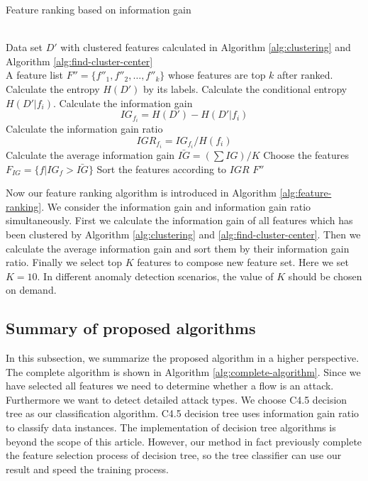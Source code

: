 \documentclass{ieeeaccess}
\theoremstyle{definition}
\begin{document}
\begin{algorithm}
    \caption{Feature ranking based on information gain}
    \label{alg:feature-ranking}
    \begin{algorithmic}[1]
        \REQUIRE ~~\\
            Data set $D'$ with clustered features calculated in Algorithm \ref{alg:clustering} and Algorithm \ref{alg:find-cluster-center}
        \ENSURE ~~\\
            A feature list $F''=\{f''_1, f''_2, \ldots, f''_k\}$ whose  features are top $k$ after ranked.
        \STATE Calculate the entropy $H(D')$ by its labels.
            \STATE Calculate the conditional entropy $H(D'|f_i)$.
            \STATE Calculate the information gain $$IG_{f_i} = H(D') - H(D'|f_i)$$
            \STATE Calculate the information gain ratio
            $$IGR_{f_i} = IG_{f_i}/H(f_i)$$
        \ENDFOR
        \STATE Calculate the average information gain $\bar{IG}=(\sum IG)/K$
        \STATE Choose the features $F_{IG}=\{f|IG_{f} > \bar{IG}\}$
        \STATE Sort the features according to $IGR$
        \RETURN $F''$
        \end{algorithmic}
\end{algorithm}

Now our feature ranking algorithm is introduced in Algorithm \ref{alg:feature-ranking}. We consider the information gain and information gain ratio simultaneously. First we calculate the information gain of all features which has been clustered by Algorithm \ref{alg:clustering} and \ref{alg:find-cluster-center}. Then we calculate the average information gain and sort them by their information gain ratio. Finally we select top $K$ features to compose new feature set. Here we set $K=10$. In different anomaly detection scenarios, the value of $K$ should be chosen on demand.

\subsection{Summary of proposed algorithms}

In this subsection, we summarize the proposed algorithm in a higher perspective. The complete algorithm is shown in Algorithm \ref{alg:complete-algorithm}.
Since we have selected all features we need to determine whether a flow is an attack. Furthermore we want to detect detailed attack types. We choose C4.5 decision tree\cite{quinlan2014c4} as our classification algorithm. C4.5 decision tree uses information gain ratio to classify data instances. The implementation of decision tree algorithms is beyond the scope of this article. However, our method in fact previously complete the feature selection process of decision tree, so the tree classifier can use our result and speed the training process.
\end{document}
